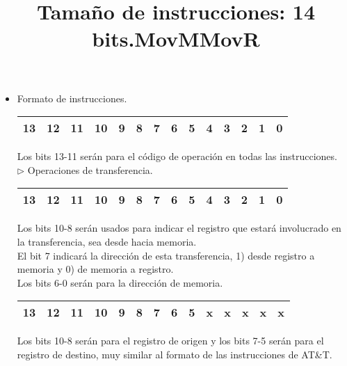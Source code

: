 \documentclass[%
	final,
	notitlepage,
	narroweqnarray,
	inline,
	twoside,
	]{ieee}
\begin{document}
\begin{itemize}



\item Formato de instrucciones.


\begin{table}[h]
\begin{center}
\title{Tamaño de instrucciones: 14 bits.}
\begin{tabular}{|c|c|c|c|c|c|c|c|c|c|c|c|c|c|}
\hline
13& 12& 11& 10& 9& 8& 7& 6& 5& 4& 3& 2& 1& 0\\
\hline
\end{tabular}
\end{center}
\end{table}%

Los bits 13-11 serán para el código de operación en todas las instrucciones.\\
\subitem $\triangleright$ Operaciones de transferencia.

\begin{table}[h]
\begin{center}
\title{MovM}
\begin{tabular}{|c|c|c|c|c|c|c|c|c|c|c|c|c|c|}
\hline
13& 12& 11& 10& 9& 8& 7& 6& 5& 4& 3& 2& 1& 0\\
\hline
\end{tabular}
\end{center}
\end{table}%
Los bits 10-8 serán usados para indicar el registro que estará involucrado en la
transferencia, sea desde hacia memoria.\\
El bit 7 indicará la dirección de esta transferencia, 1) desde registro a memoria y 0)
de memoria a registro.\\
Los bits 6-0 serán para la dirección de memoria.\\


\begin{table}[h]
\begin{center}
\title{MovR}
\begin{tabular}{|c|c|c|c|c|c|c|c|c|c|c|c|c|c|}
\hline
13& 12& 11& 10& 9& 8& 7& 6& 5& x& x& x& x& x\\
\hline
\end{tabular}
\end{center}
\end{table}%
Los bits 10-8 serán para el registro de origen y los bits 7-5 serán para el registro
de destino, muy similar al formato de las instrucciones de AT\&T.\\



\end{itemize}
\end{document}
